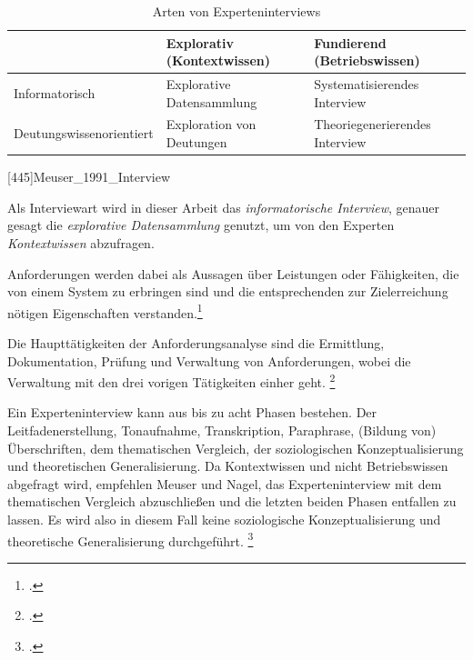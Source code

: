 \begin{table}[H]
\centering
\begin{tabularx}{1\textwidth}{l|X|X}
                            & Explorativ (Kontextwissen) & Fundierend (Betriebswissen) \\\hline
   Informatorisch           & Explorative Datensammlung & Systematisierendes Interview \\
   Deutungswissenorientiert & Exploration von Deutungen & Theoriegenerierendes Interview\\
\end{tabularx}
  [445\psqq]{Meuser_1991_Interview}
\caption{Arten von Experteninterviews}
\label{tab:artenei}
\end{table}




 Als Interviewart wird in dieser Arbeit das \textit{informatorische Interview}, genauer gesagt die \textit{explorative Datensammlung} genutzt, um von den Experten \textit{Kontextwissen} abzufragen.

Anforderungen werden dabei als Aussagen über Leistungen oder Fähigkeiten, die von einem System zu erbringen sind und die entsprechenden zur Zielerreichung nötigen Eigenschaften verstanden.\footcite[Vgl.][3]{Pohl_2015_Requirements}

Die Haupttätigkeiten der Anforderungsanalyse sind die Ermittlung, Dokumentation, Prüfung und Verwaltung von Anforderungen, wobei die Verwaltung mit den drei vorigen Tätigkeiten einher geht. \footcite[Vgl.][4\psq]{Pohl_2015_Requirements}

Ein Experteninterview kann aus bis zu acht Phasen bestehen. Der Leitfadenerstellung, Tonaufnahme, Transkription, Paraphrase, (Bildung von) Überschriften, dem thematischen Vergleich, der soziologischen Konzeptualisierung und theoretischen Generalisierung.
Da Kontextwissen und nicht Betriebswissen abgefragt wird, empfehlen Meuser und Nagel, das Experteninterview mit dem thematischen Vergleich abzuschließen und die letzten beiden Phasen entfallen zu lassen. Es wird also in diesem Fall keine soziologische Konzeptualisierung und theoretische Generalisierung durchgeführt. \footcite[Vgl.][466\psq]{Meuser_1991_Interview}

